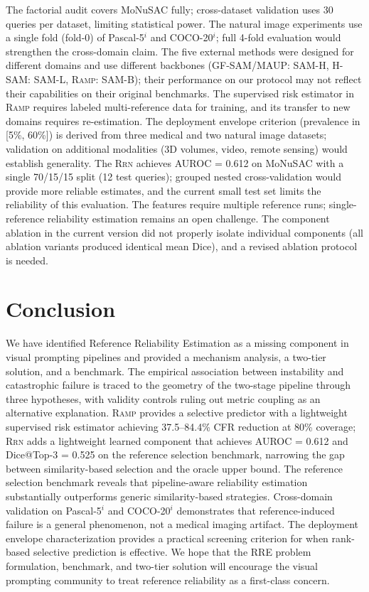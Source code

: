 \documentclass[10pt,twocolumn,letterpaper]{article}
\newcommand{\RAMP}{\textsc{Ramp}}
\newcommand{\RRN}{\textsc{Rrn}}
\begin{document}
The factorial audit covers MoNuSAC fully; cross-dataset validation uses 30
queries per dataset, limiting statistical power. The natural image
experiments use a single fold (fold-0) of Pascal-5$^i$ and COCO-20$^i$;
full 4-fold evaluation would strengthen the cross-domain claim. The five
external methods were designed for different domains and use different
backbones (GF-SAM/MAUP: SAM-H, H-SAM: SAM-L, \RAMP{}: SAM-B); their
performance on our protocol may not reflect their capabilities on their
original benchmarks. The supervised risk estimator in \RAMP{} requires
labeled multi-reference data for training, and its transfer to new domains
requires re-estimation. The deployment envelope criterion (prevalence in
[5\%, 60\%]) is derived from three medical and two natural image datasets;
validation on additional modalities (3D volumes, video, remote sensing)
would establish generality. The \RRN{} achieves AUROC = 0.612 on MoNuSAC
with a single 70/15/15 split (12 test queries); grouped nested cross-validation
would provide more reliable estimates, and the current small test set
limits the reliability of this evaluation. The features require
multiple reference runs; single-reference reliability estimation remains an
open challenge. The component ablation in the current version did not
properly isolate individual components (all ablation variants produced
identical mean Dice), and a revised ablation protocol is needed.

\section{Conclusion}

We have identified Reference Reliability Estimation as a missing component
in visual prompting pipelines and provided a mechanism analysis, a two-tier
solution, and a benchmark. The empirical association between instability and
catastrophic failure is traced to the geometry of the two-stage pipeline
through three hypotheses, with validity controls ruling out metric coupling
as an alternative explanation. \RAMP{} provides a selective predictor with a
lightweight supervised risk estimator achieving 37.5--84.4\% CFR
reduction at 80\% coverage; \RRN{} adds a lightweight learned component
that achieves AUROC = 0.612 and Dice@Top-3 = 0.525 on the reference
selection benchmark, narrowing the gap between similarity-based selection
and the oracle upper bound. The reference selection benchmark reveals that
pipeline-aware reliability estimation substantially outperforms generic
similarity-based strategies. Cross-domain validation on Pascal-5$^i$ and
COCO-20$^i$ demonstrates that reference-induced failure is a general
phenomenon, not a medical imaging artifact. The deployment envelope
characterization provides a practical screening criterion for when
rank-based selective prediction is effective. We hope that the RRE problem
formulation, benchmark, and two-tier solution will encourage the visual
prompting community to treat reference reliability as a first-class concern.
\end{document}
